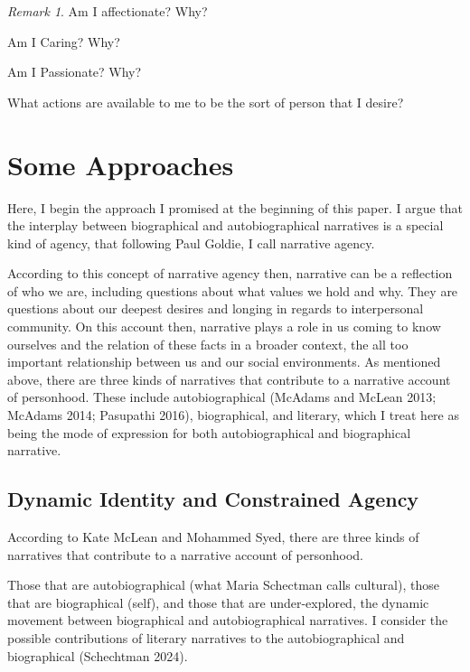 \documentclass[12pt]{book}
\theoremstyle{definition}
\theoremstyle{remark}
\newtheorem{remark}[theorem]{Remark}
\begin{document}
\begin{remark}
Am I affectionate? Why?

Am I Caring? Why?

Am I Passionate? Why?
\end{remark}

What actions are available to me to be the sort of person that I desire?

\section{Some Approaches}\label{some-approaches}

Here, I begin the approach I promised at the beginning of this paper. I argue that the interplay between biographical and autobiographical narratives is a special kind of agency, that following Paul Goldie, I call narrative agency.

According to this concept of narrative agency then, narrative can be a reflection of who we are, including questions about what values we hold and why. They are questions about our deepest desires and longing in regards to interpersonal community. On this account then, narrative plays a role in us coming to know ourselves and the relation of these facts in a broader context, the all too important relationship between us and our social environments. As mentioned above, there are three kinds of narratives that contribute to a narrative account of personhood. These include autobiographical (McAdams and McLean 2013; McAdams 2014; Pasupathi 2016), biographical, and literary, which I treat here as being the mode of expression for both autobiographical and biographical narrative.

\subsection{Dynamic Identity and Constrained Agency}\label{dynamic-identity-and-constrained-agency}

According to Kate McLean and Mohammed Syed, there are three kinds of narratives that contribute to a narrative account of personhood.

Those that are autobiographical (what Maria Schectman calls cultural), those that are biographical (self), and those that are under-explored, the dynamic movement between biographical and autobiographical narratives. I consider the possible contributions of literary narratives to the autobiographical and biographical (Schechtman 2024).
\end{document}
